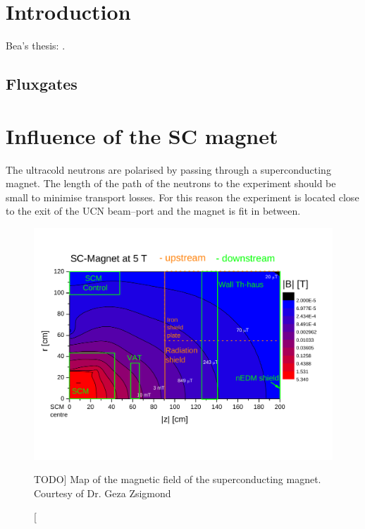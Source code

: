 \section{Introduction}
Bea's thesis: \cite{Franke2013}.



\subsection{Fluxgates}


\section{Influence of the SC magnet}
The ultracold neutrons are polarised by passing through a superconducting magnet. The length of the path of the neutrons to the experiment should be small to minimise transport losses. For this reason the experiment is located close to the exit of the UCN beam--port and the magnet is fit in between.

\begin{figure}
  \myfloatalign
  \includegraphics[width=.7\linewidth]{gfx/nEDM_SFC/SCM_magn_map.pdf}
  \caption
  [TODO]
  {Map of the magnetic field of the superconducting magnet. Courtesy of Dr. Geza Zsigmond}
  \label{fig:nEDM_SFC_SC_magnet_map}
\end{figure}

